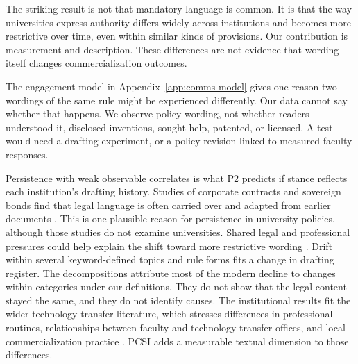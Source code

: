 \documentclass[11pt]{article}
\begin{document}
The striking result is not that mandatory language is common. It is that the way universities express authority differs widely across institutions and becomes more restrictive over time, even within similar kinds of provisions. Our contribution is measurement and description. These differences are not evidence that wording itself changes commercialization outcomes.

The engagement model in Appendix~\ref{app:comms-model} gives one reason two wordings of the same rule might be experienced differently. Our data cannot say whether that happens. We observe policy wording, not whether readers understood it, disclosed inventions, sought help, patented, or licensed. A test would need a drafting experiment, or a policy revision linked to measured faculty responses.

Persistence with weak observable correlates is what P2 predicts if stance reflects each institution's drafting history. Studies of corporate contracts and sovereign bonds find that legal language is often carried over and adapted from earlier documents \citep{kahan1997standardization,choi2013dynamics}. This is one plausible reason for persistence in university policies, although those studies do not examine universities. Shared legal and professional pressures could help explain the shift toward more restrictive wording \citep{dimaggio1983iron,edelman1992legal}. Drift within several keyword-defined topics and rule forms fits a change in drafting register. The decompositions attribute most of the modern decline to changes within categories under our definitions. They do not show that the legal content stayed the same, and they do not identify causes. The institutional results fit the wider technology-transfer literature, which stresses differences in professional routines, relationships between faculty and technology-transfer offices, and local commercialization practice \citep{owensmith2001patent,siegel2003assessing,bercovitz2008academic,perkmann2021academic}. PCSI adds a measurable textual dimension to those differences.
\end{document}
